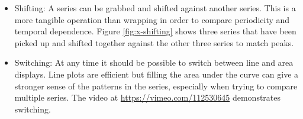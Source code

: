 \documentclass[12pt]{article}
\begin{document}
\begin{itemize}
\item Shifting: A series can be grabbed and shifted against another series. This is a more tangible operation than wrapping in order to compare periodicity and temporal dependence. Figure \ref{fig:x-shifting} shows three series that have been picked up and shifted together against the other three series to match peaks.



\item Switching: At any time it should be possible to switch between line and area displays. Line plots are efficient but filling the area under the curve can give a stronger sense of the patterns in the series, especially when trying to compare multiple series.   The video at \url{https://vimeo.com/112530645} demonstrates switching.




\end{itemize}
\end{document}
